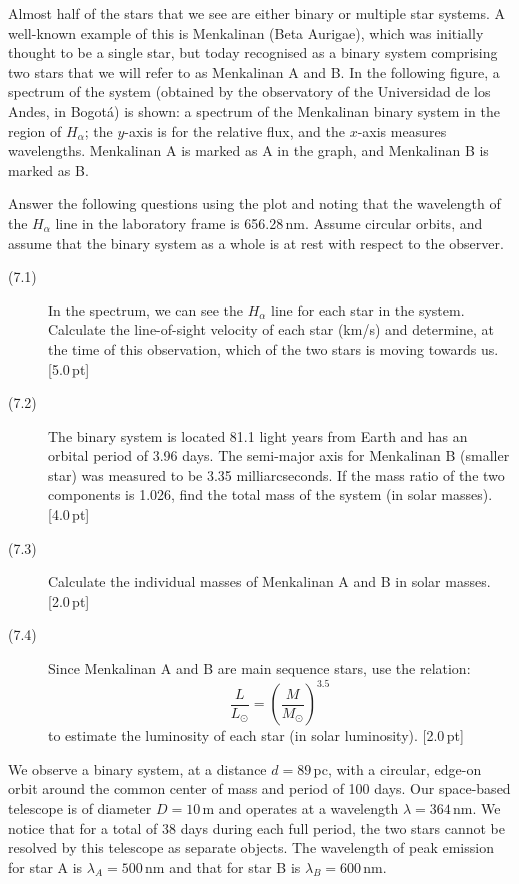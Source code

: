 Almost half of the stars that we see are either binary or multiple star
systems. A well-known example of this is Menkalinan (Beta Aurigae), which was
initially thought to be a single star, but today recognised as a binary
system comprising two stars that we will refer to as Menkalinan A and B. In
the following figure, a spectrum of the system (obtained by the observatory
of the Universidad de los Andes, in Bogot\'a) is shown: a spectrum of the
Menkalinan binary system in the region of $H_\alpha$; the $y$-axis is for the
relative flux, and the $x$-axis measures wavelengths. Menkalinan A is marked
as A in the graph, and Menkalinan B is marked as B.

Answer the following questions using the plot and noting that the wavelength
of the $H_\alpha$ line in the laboratory frame is 656.28\,nm. Assume circular
orbits, and assume that the binary system as a whole is at rest with respect
to the observer.

\begin{description}
\item[(7.1)] In the spectrum, we can see the $H_\alpha$ line for each star
  in the system. Calculate the line-of-sight velocity of each star (km/s)
  and determine, at the time of this observation, which of the two stars is
  moving towards us. \hfill[5.0\,pt]
\item[(7.2)] The binary system is located 81.1 light years from Earth and
  has an orbital period of 3.96 days. The semi-major axis for Menkalinan B
  (smaller star) was measured to be 3.35 milliarcseconds. If the mass ratio
  of the two components is 1.026, find the total mass of the system (in
  solar masses). \hfill[4.0\,pt]
\item[(7.3)] Calculate the individual masses of Menkalinan A and B in solar
  masses. \hfill[2.0\,pt]
\item[(7.4)] Since Menkalinan A and B are main sequence stars, use the
  relation:
  \[ \frac{L}{L_\odot} = \left(\frac{M}{M_\odot}\right)^{3.5} \]
  to estimate the luminosity of each star (in solar luminosity).
  \hfill[2.0\,pt]
\end{description}

We observe a binary system, at a distance $d = 89$\,pc, with a circular,
edge-on orbit around the common center of mass and period of 100 days. Our
space-based telescope is of diameter $D = 10$\,m and operates at a wavelength
$\lambda = 364$\,nm. We notice that for a total of 38 days during each full
period, the two stars cannot be resolved by this telescope as separate
objects. The wavelength of peak emission for star A is
$\lambda_A = 500$\,nm and that for star B is $\lambda_B = 600$\,nm.

